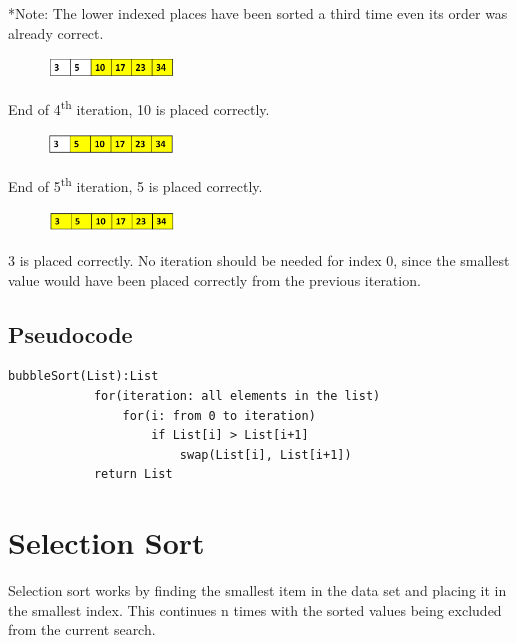 *Note: The lower indexed places have been sorted a third time even its order was already correct.

\begin{figure}[H]
\centering
\includegraphics[width=0.3\textwidth]{pictures/bubble10.png}
\label{fig:bubble10}
\end{figure}

End of 4\textsuperscript{th} iteration, 10 is placed correctly.

\begin{figure}[H]
\centering
\includegraphics[width=0.3\textwidth]{pictures/bubble11.png}
\label{fig:bubble11}
\end{figure}

End of 5\textsuperscript{th} iteration, 5 is placed correctly.

\begin{figure}[H]
\centering
\includegraphics[width=0.3\textwidth]{pictures/bubble12.png}
\label{fig:bubble12}
\end{figure}

3 is placed correctly. No iteration should be needed for index 0, since the smallest value would have been placed correctly from the previous iteration.

\subsection{Pseudocode}

\begin{verbatim}
bubbleSort(List):List
            for(iteration: all elements in the list)
                for(i: from 0 to iteration)
                    if List[i] > List[i+1]
                        swap(List[i], List[i+1])
            return List
\end{verbatim}

\section{Selection Sort}
Selection sort works by finding the smallest item in the data set and placing it in the smallest index. This continues n times with the sorted values being excluded from the current search. \newline

